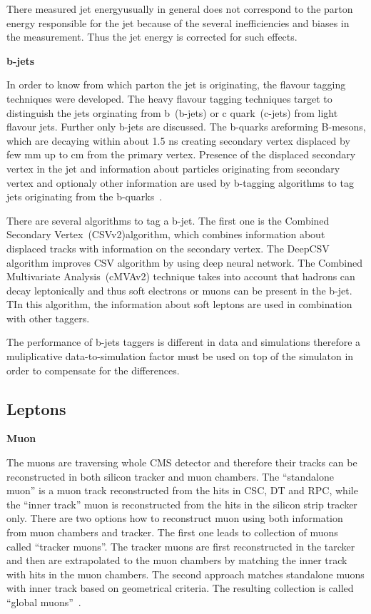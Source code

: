 There measured jet energyusually in general does not correspond to the parton energy responsible for the jet because of the several inefficiencies and biases in the measurement. Thus the jet energy is corrected for such effects.

\textbf{b-jets}

In order to know from which parton the jet is originating, the flavour tagging techniques were developed. The heavy flavour tagging techniques target to distinguish the jets orginating from b~(b-jets) or c quark~(c-jets) from light flavour jets. Further only b-jets are discussed. The b-quarks areforming B-mesons, which are decaying within about 1.5 ns creating secondary vertex displaced by few mm up to cm from the primary vertex. Presence of the displaced secondary vertex in the jet and information about particles originating from secondary vertex and optionaly other information are used by b-tagging algorithms to tag jets originating from the b-quarks~\cite{Sirunyan:2017ezt}.

There are several algorithms to tag a b-jet. The first one is the Combined Secondary Vertex~(CSVv2)algorithm, which combines information about displaced tracks with information on the secondary vertex. The DeepCSV algorithm improves CSV algorithm by using deep neural network. The Combined Multivariate Analysis~(cMVAv2) technique takes into account that hadrons can decay leptonically and thus soft electrons or muons can be present in the b-jet. TIn this algorithm, the information about soft leptons are used in combination with other taggers.

The performance of b-jets taggers is different in data and simulations therefore a muliplicative data-to-simulation factor must be used on top of the simulaton in order to compensate for the differences.

\subsection{Leptons}

\textbf{Muon}

The muons are traversing whole CMS detector and therefore their tracks can be reconstructed in both silicon tracker and muon chambers. The ``standalone muon'' is a muon track reconstructed from the hits in CSC, DT and RPC, while the ``inner track'' muon is reconstructed from the hits in the silicon strip tracker only. There are two options how to reconstruct muon using both information from muon chambers and tracker. The first one leads to collection of muons called ``tracker muons''.  The tracker muons are first reconstructed in the tarcker and then are extrapolated to the muon chambers by matching the inner track with hits in the muon chambers. The second approach matches standalone
muons with inner track based on geometrical criteria. The resulting collection is called ``global muons''~\cite{Chatrchyan:2012xi}. 

